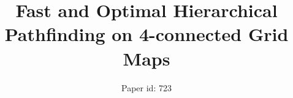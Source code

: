 \documentclass{ecai2010}
\begin{document}
\title{Fast and Optimal Hierarchical Pathfinding on 4-connected Grid Maps}
\author{Paper id: 723}


\maketitle




 




%



\end{document}
